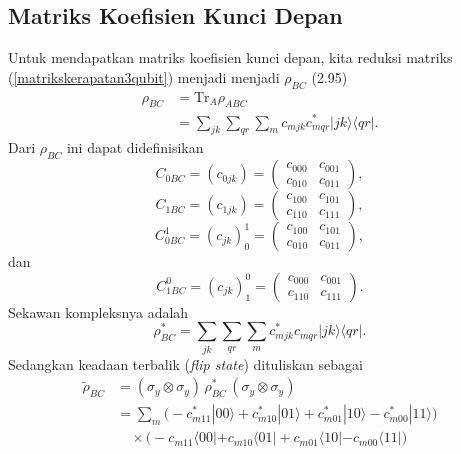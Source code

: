 \subsection{Matriks Koefisien Kunci Depan}
Untuk mendapatkan matriks koefisien kunci depan, kita reduksi matriks (\ref{matrikskerapatan3qubit}) menjadi menjadi $\rho_{BC}$ (2.95)
\begin{equation}
	\begin{aligned}
		\rho_{BC}
		&=\mathrm{Tr}_A\rho_{ABC}\\
		&= \sum_{j k} \sum_{q r}\sum_m
		c_{m j k} c^{*}_{m q r}
		| j k \rangle \langle q r |.
	\end{aligned}
\end{equation}
Dari $\rho_{BC}$ ini dapat didefinisikan
\begin{equation}
	C_{0BC}=(c_{0jk})=
	\begin{pmatrix}
		c_{000} & c_{001} \\
		c_{010} & c_{011}
	\end{pmatrix},
\end{equation}
\begin{equation}
	C_{1BC}=(c_{1jk})=
	\begin{pmatrix}
		c_{100} & c_{101} \\
		c_{110} & c_{111}
	\end{pmatrix},
\end{equation}
\begin{equation}
	C_{0BC}^1=(c_{jk})_0^1=
	\begin{pmatrix}
		c_{100} & c_{101} \\
		c_{010} & c_{011}
	\end{pmatrix},
\end{equation}
dan
\begin{equation}
	C_{1BC}^0=(c_{jk})_1^0=
	\begin{pmatrix}
		c_{000} & c_{001} \\
		c_{110} & c_{111}
	\end{pmatrix}.
\end{equation}
Sekawan kompleksnya adalah
\begin{equation}
	\rho^{*}_{BC}
	= \sum_{j k} \sum_{q r} \sum_m
	c^{*}_{m j k} c_{m q r}
	| j k \rangle \langle q r |.
\end{equation}
Sedangkan keadaan terbalik (\textit{flip state}) dituliskan sebagai
\begin{equation}
	\begin{aligned}
		\tilde{\rho}_{BC}
		&= (\sigma_y \otimes \sigma_y)\,
		\rho^{*}_{BC}\,
		(\sigma_y \otimes \sigma_y) \\
		&= \sum_m
		\Big(
		- c^{*}_{m11} |00\rangle
		+ c^{*}_{m10} |01\rangle
		+ c^{*}_{m01} |10\rangle
		- c^{*}_{m00} |11\rangle
		\Big) \\
		&\quad \times
		\Big(
		- c_{m11} \langle 00|
		+ c_{m10} \langle 01|
		+ c_{m01} \langle 10|
		- c_{m00} \langle 11|
		\Big)
	\end{aligned}
\end{equation}
